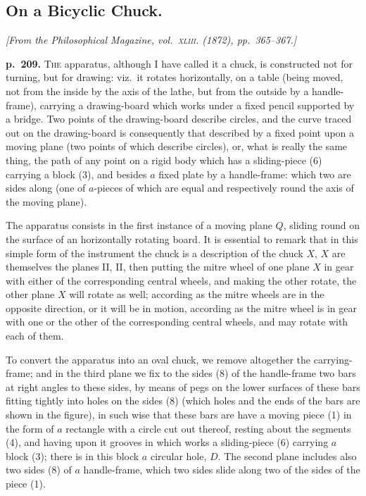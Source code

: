 \documentclass[11pt,a4paper]{article}
\begin{document}
\subsection{On a Bicyclic Chuck.}

\begin{center}
\textit{[From the Philosophical Magazine, vol.\ \textsc{xliii}. (1872), pp.\ 365--367.]}
\end{center}

\noindent
\textbf{p.~209.}  \textsc{The} apparatus, although I have called it a chuck, is constructed not for turning, but for drawing: viz.\ it rotates horizontally, on a table (being moved, not from the inside by the axis of the lathe, but from the outside by a handle-frame), carrying a drawing-board which works under a fixed pencil supported by a bridge.  Two points of the drawing-board describe circles, and the curve traced out on the drawing-board is consequently that described by a fixed point upon a moving plane (two points of which describe circles), or, what is really the same thing, the path of any point on a rigid body which has a sliding-piece (6) carrying a block (3), and besides $a$ fixed plate by a handle-frame: which two are sides along (one of $a$-pieces of which are equal and respectively round the axis of the moving plane).

The apparatus consists in the first instance of a moving plane $Q$, sliding round on the surface of an horizontally rotating board.  It is essential to remark that in this simple form of the instrument the chuck is a description of the chuck $X$, $X$ are themselves the planes II, II, then putting the mitre wheel of one plane $X$ in gear with either of the corresponding central wheels, and making the other rotate, the other plane $X$ will rotate as well; according as the mitre wheels are in the opposite direction, or it will be in motion, according as the mitre wheel is in gear with one or the other of the corresponding central wheels, and may rotate with each of them.

To convert the apparatus into an oval chuck, we remove altogether the carrying-frame; and in the third plane we fix to the sides (8) of the handle-frame two bars at right angles to these sides, by means of pegs on the lower surfaces of these bars fitting tightly into holes on the sides (8) (which holes and the ends of the bars are shown in the figure), in such wise that these bars are have a moving piece (1) in the form of $a$ rectangle with a circle cut out thereof, resting about the segments (4), and having upon it grooves in which works a sliding-piece (6) carrying $a$ block (3); there is in this block $a$ circular hole, $D$.  The second plane includes also two sides (8) of $a$ handle-frame, which two sides slide along two of the sides of the piece (1).
\end{document}
